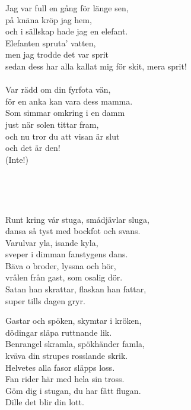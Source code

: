 Jag var full en gång för länge sen,\\
på knäna kröp jag hem,\\
och i sällskap hade jag en elefant.\\
Elefanten spruta' vatten,\\
men jag trodde det var sprit\\
sedan dess har alla kallat mig för skit, mera sprit! \\

\melochtext{}\\

\songtext{}Var rädd om din fyrfota vän,\\
för en anka kan vara dess mamma.\\
Som simmar omkring i en damm\\
just när solen tittar fram,\\
och nu tror du att visan är slut\\
och det är den!\\
(Inte!)

\\
\newpage

 \\       

\songtext{}Runt kring vår stuga, smådjävlar sluga, \\
dansa så tyst med bockfot och svans.\\
Varulvar yla, isande kyla,\\
sveper i dimman fanstygens dans.\\
Bäva o broder, lyssna och hör,\\
vrålen från gast, som osalig dör.\\
Satan han skrattar, flaskan han fattar,\\
super tills dagen gryr.

Gastar och spöken, skymtar i kröken,\\
dödingar släpa ruttnande lik.\\
Benrangel skramla, spökhänder famla,\\
kväva din strupes rosslande skrik.\\
Helvetes alla fasor släpps loss.\\
Fan rider här med hela sin tross.\\
Göm dig i stugan, du har fått flugan.\\
Dille det blir din lott. \\

